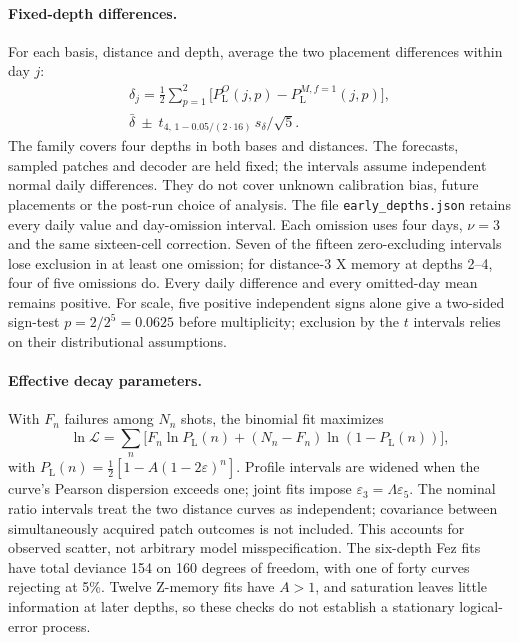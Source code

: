 \documentclass[aps,pra,reprint,nofootinbib,longbibliography,floatfix,showkeys]{revtex4-2}
\newcommand{\eps}{\varepsilon}
\newcommand{\PL}{P_{\mathrm{L}}}
\begin{document}
\paragraph*{Fixed-depth differences.}
For each basis, distance and depth, average the two placement differences within day $j$:
\begin{equation}
\begin{gathered}
\delta_j=\tfrac12\sum_{p=1}^2\bigl[\PL^O(j,p)-\PL^{M,f=1}(j,p)\bigr],\\
\bar\delta\ \pm\ t_{4,\,1-0.05/(2\cdot16)}\,s_\delta/\sqrt5 .
\end{gathered}
\label{eq:depthci}
\end{equation}
The family covers four depths in both bases and distances.
The forecasts, sampled patches and decoder are held fixed; the intervals assume independent normal daily differences.
They do not cover unknown calibration bias, future placements or the post-run choice of analysis.
The file \texttt{early\_depths.json} retains every daily value and day-omission interval.
Each omission uses four days, $\nu=3$ and the same sixteen-cell correction.
Seven of the fifteen zero-excluding intervals lose exclusion in at least one omission; for distance-3 X memory at depths 2--4, four of five omissions do.
Every daily difference and every omitted-day mean remains positive.
For scale, five positive independent signs alone give a two-sided sign-test $p=2/2^5=0.0625$ before multiplicity; exclusion by the $t$ intervals relies on their distributional assumptions.

\paragraph*{Effective decay parameters.}
With $F_n$ failures among $N_n$ shots, the binomial fit maximizes
\begin{equation}
\ln \mathcal{L}=\sum_n\bigl[F_n\ln\PL(n)+(N_n-F_n)\ln(1-\PL(n))\bigr],
\label{eq:binlik}
\end{equation}
with $\PL(n)=\tfrac12[1-A(1-2\eps)^n]$.
Profile intervals are widened when the curve's Pearson dispersion exceeds one; joint fits impose $\eps_3=\Lambda\eps_5$.
The nominal ratio intervals treat the two distance curves as independent; covariance between simultaneously acquired patch outcomes is not included.
This accounts for observed scatter, not arbitrary model misspecification.
The six-depth Fez fits have total deviance 154 on 160 degrees of freedom, with one of forty curves rejecting at 5\%.
Twelve Z-memory fits have $A>1$, and saturation leaves little information at later depths, so these checks do not establish a stationary logical-error process.
\end{document}
